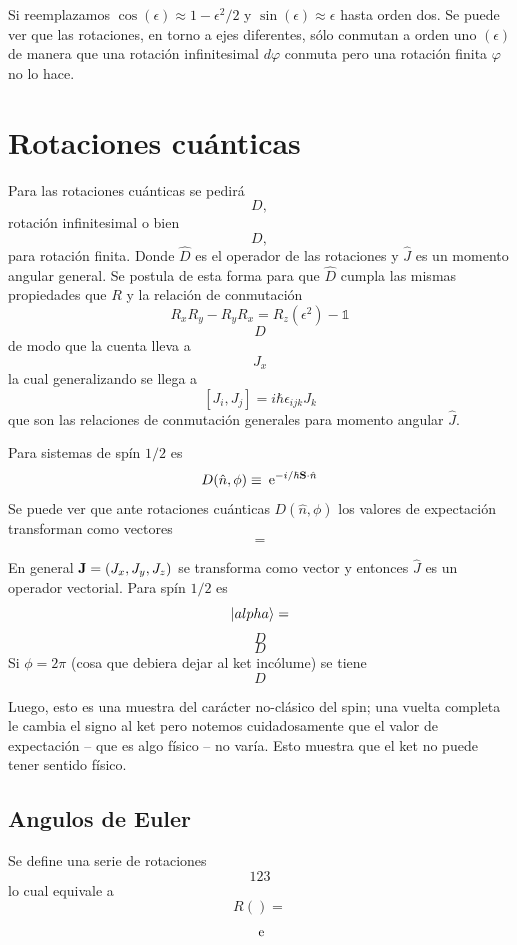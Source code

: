 \documentclass[10pt,oneside]{CBFT_book}
\begin{document}
Si reemplazamos $\cos(\epsilon) \approx 1 - \epsilon^2/2$ y $\sin(\epsilon) \approx \epsilon$ hasta orden dos.
Se puede ver que las rotaciones, en torno a ejes diferentes, sólo conmutan a orden uno $(\epsilon)$ de manera 
que una rotación infinitesimal $d\varphi$ conmuta pero una rotación finita $\varphi$ no lo hace.

\section{Rotaciones cuánticas}

Para las rotaciones cuánticas se pedirá
\[
	D,
\]
rotación infinitesimal o bien
\[
	D,
\]
para rotación finita. Donde $\hat{D}$ es el operador de las rotaciones y $\hat{J}$ es un momento angular 
general. Se postula de esta forma para que $\hat{D}$ cumpla las mismas propiedades que $R$ y la relación de 
conmutación
\[
	R_x R_y - R_y R_x = R_z (\epsilon^2) - \mathbb{1}
\]
\[
	D
\]
de modo que la cuenta lleva a  
\[
	J_x
\]
la cual generalizando se llega a 
\[
	[J_i,J_j] = i \hbar \epsilon_{ijk} J_k
\]
que son las relaciones de conmutación generales para momento angular $\hat{J}$.

Para sistemas de spín $1/2$ es 
\[
	D(\hat{n},\phi) \equiv \euler^{-i/\hbar \vb{S}\cdot\hat{n} }
\]
Se puede ver que ante rotaciones cuánticas $D(\hat{n},\phi)$ los valores de expectación transforman como 
vectores
\[
	=
\]

En general $\vb{J} = (J_x, J_y, J_z)$ se transforma como vector y entonces $\hat{J}$ es un operador vectorial.
Para spín $1/2$ es
\[
	\Ket{alpha} =
\]
\[
	D
\]
\[
	D
\]
Si $\phi=2\pi$ (cosa que debiera dejar al ket incólume) se tiene 
\[
	D
\]

Luego, esto es una muestra del carácter no-clásico del spin; una vuelta completa le cambia el signo al ket 
pero notemos cuidadosamente que el valor de expectación -- que es algo físico -- no varía. Esto muestra que 
el ket no puede tener sentido físico.

\subsection{Angulos de Euler}

Se define una serie de rotaciones 
\[
	1 2 3
\]
lo cual equivale a
\[
	R() = 
\]
\[
	\:\mathrm{e}
\]
\end{document}
